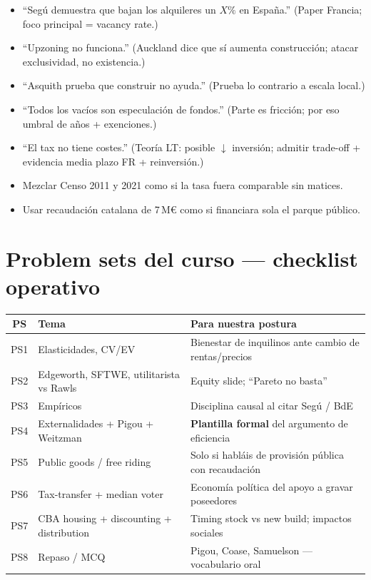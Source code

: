 \documentclass[11pt,a4paper]{report}
\begin{document}
\begin{cuidado}[title={Trampas}]
\begin{itemize}
  \item ``Seg\'u demuestra que bajan los alquileres un $X\%$ en Espa\~na.''
        (Paper Francia; foco principal = vacancy rate.)
  \item ``Upzoning no funciona.''
        (Auckland dice que s\'i aumenta construcci\'on; atacar exclusividad, no existencia.)
  \item ``Asquith prueba que construir no ayuda.''
        (Prueba lo contrario a escala local.)
  \item ``Todos los vac\'ios son especulaci\'on de fondos.''
        (Parte es fricci\'on; por eso umbral de a\~nos + exenciones.)
  \item ``El tax no tiene costes.''
        (Teor\'ia LT: posible $\downarrow$ inversi\'on; admitir trade-off + evidencia media plazo FR + reinversi\'on.)
  \item Mezclar Censo 2011 y 2021 como si la tasa fuera comparable sin matices.
  \item Usar recaudaci\'on catalana de 7\,M€ como si financiara sola el parque p\'ublico.
\end{itemize}
\end{cuidado}

\chapter{Problem sets del curso --- checklist operativo}
\label{ch:ps}

\begin{center}
\renewcommand{\arraystretch}{1.2}
\begin{tabularx}{\textwidth}{@{}c>{\raggedright\arraybackslash}p{4cm} X@{}}
\toprule
\textbf{PS} & \textbf{Tema} & \textbf{Para nuestra postura} \\
\midrule
PS1 & Elasticidades, CV/EV & Bienestar de inquilinos ante cambio de rentas/precios \\
PS2 & Edgeworth, SFTWE, utilitarista vs Rawls & Equity slide; ``Pareto no basta'' \\
PS3 & Emp\'iricos & Disciplina causal al citar Seg\'u / BdE \\
PS4 & Externalidades + Pigou + Weitzman & \textbf{Plantilla formal} del argumento de eficiencia \\
PS5 & Public goods / free riding & Solo si habl\'ais de provisi\'on p\'ublica con recaudaci\'on \\
PS6 & Tax-transfer + median voter & Econom\'ia pol\'itica del apoyo a gravar poseedores \\
PS7 & CBA housing + discounting + distribution & Timing stock vs new build; impactos sociales \\
PS8 & Repaso / MCQ & Pigou, Coase, Samuelson --- vocabulario oral \\
\bottomrule
\end{tabularx}
\end{center}
\end{document}
